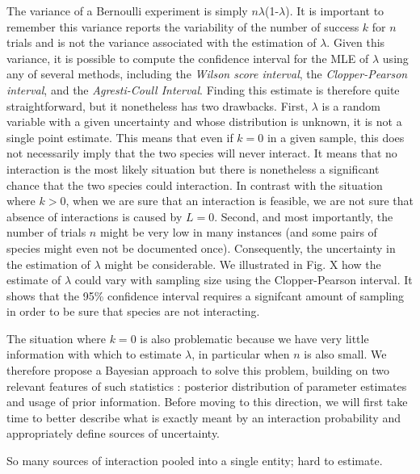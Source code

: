 ﻿\documentclass[12pt]{article}
\begin{document}
  The variance of a Bernoulli experiment is simply $n\lambda$(1-$\lambda$). It is important to remember this variance reports the variability of the number of success $k$ for $n$ trials and is not the variance associated with the estimation of $\lambda$.
  Given this variance, it is possible to compute the confidence interval for the MLE of $\lambda$ using any of several methods, including the \emph{Wilson score interval}, the \emph{Clopper-Pearson interval}, and the \emph{Agresti-Coull Interval}. Finding this estimate is therefore quite straightforward, but it nonetheless has two drawbacks. First, $\lambda$ is a random variable with a given uncertainty and whose distribution is unknown, it is not a single point estimate. This means that even if $k = 0$ in a given sample, this does not necessarily imply that the two species will never interact. It means that no interaction is the most likely situation but there is nonetheless a significant chance that the two species could interaction. In contrast with the situation where $k>0$, when we are sure that an interaction is feasible, 
  we are not sure that absence of interactions is caused by $L=0$. Second, and most importantly, the number of trials $n$ might be very low in many instances (and some pairs of species might even not be documented once). Consequently, the uncertainty in the estimation of $\lambda$ might be considerable. We illustrated in Fig. X how the estimate of $\lambda$ could vary with sampling size using the Clopper-Pearson interval. It shows that the 95\% confidence interval requires a signifcant amount of sampling in order to be sure that species are not interacting. 


  The situation where $k = 0$ is also problematic because we have very little information with which to estimate $\lambda$, in particular when $n$ is also small. We therefore propose a Bayesian approach to solve this problem, building on two relevant features of such statistics : posterior distribution of parameter estimates and usage of prior information. Before moving to this direction, we will first take time to better describe what is exactly meant by an interaction probability and appropriately define sources of uncertainty.


  So many sources of interaction pooled into a single entity; hard to estimate.
\end{document}
